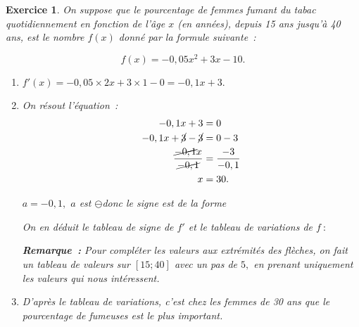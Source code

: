 \documentclass[10pt]{article}
\newtheorem{exo}{Exercice}
\begin{document}
\begin{exo}

On suppose que le pourcentage de femmes fumant du tabac quotidiennement en fonction de l’âge $x$ (en années), depuis 15 ans jusqu’à 40 ans, est le nombre $f(x)$ donné par la formule suivante~:

\[f(x)=-0,05 x^2+3 x-10.\]

\begin{enumerate}
\item $f'(x)=-0,05\times 2x+3\times 1-0=-0,1x+3.$
\item On résout l'équation~:
\begin{align*}-0,1x+3&=0\\
 -0,1x+\cancel{3}-\cancel{3}&=0-3\\
 \frac{\cancel{-0,1}x}{\cancel{-0,1}}&=\frac{-3}{-0,1}\\
 x&=30.
 \end{align*}

$a=-0,1,$ $a$ est \Large $\ominus$\normalsize donc le signe est de la forme \fbox{$+~\upphi~-$}

\medskip


On en déduit le tableau de signe de $f'$ et le tableau de variations de $f~:$


\medskip

\begin{center}
\end{center}

\medskip

\textbf{Remarque~:} Pour compléter les valeurs aux extrémités des flèches, on fait un tableau de valeurs sur $\left[15;40\right]$ avec un pas de $5,$ en prenant uniquement les valeurs qui nous intéressent.
\item D'après le tableau de variations, c'est chez les femmes de 30 ans que le pourcentage de fumeuses est le plus important.
\end{enumerate}
\end{exo}
\end{document}
